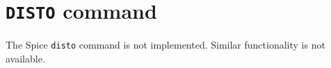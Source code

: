 %
%
%
%
\section{{\tt DISTO} command}
The Spice {\tt disto} command is not implemented.  Similar functionality is
not available.
